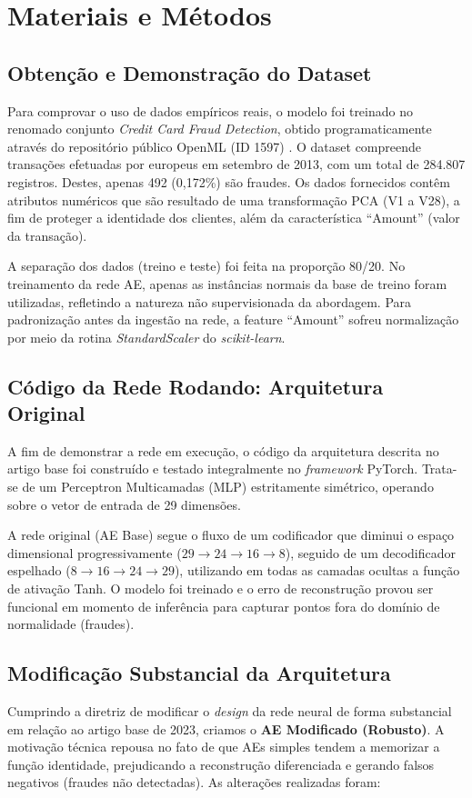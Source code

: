 \documentclass[runningheads]{template_llncs/llncs}
\begin{document}
\section{Materiais e Métodos}

\subsection{Obtenção e Demonstração do Dataset}
Para comprovar o uso de dados empíricos reais, o modelo foi treinado no renomado conjunto \emph{Credit Card Fraud Detection}, obtido programaticamente através do repositório público OpenML (ID 1597) \cite{kaggle}. 
O dataset compreende transações efetuadas por europeus em setembro de 2013, com um total de 284.807 registros. Destes, apenas 492 (0,172\%) são fraudes. 
Os dados fornecidos contêm atributos numéricos que são resultado de uma transformação PCA (V1 a V28), a fim de proteger a identidade dos clientes, além da característica ``Amount'' (valor da transação).

A separação dos dados (treino e teste) foi feita na proporção 80/20. No treinamento da rede AE, apenas as instâncias normais da base de treino foram utilizadas, refletindo a natureza não supervisionada da abordagem. Para padronização antes da ingestão na rede, a feature ``Amount'' sofreu normalização por meio da rotina \emph{StandardScaler} do \emph{scikit-learn}.

\subsection{Código da Rede Rodando: Arquitetura Original}
A fim de demonstrar a rede em execução, o código da arquitetura descrita no artigo base foi construído e testado integralmente no \emph{framework} PyTorch. Trata-se de um Perceptron Multicamadas (MLP) estritamente simétrico, operando sobre o vetor de entrada de 29 dimensões.

A rede original (AE Base) segue o fluxo de um codificador que diminui o espaço dimensional progressivamente ($29 \to 24 \to 16 \to 8$), seguido de um decodificador espelhado ($8 \to 16 \to 24 \to 29$), utilizando em todas as camadas ocultas a função de ativação Tanh. O modelo foi treinado e o erro de reconstrução provou ser funcional em momento de inferência para capturar pontos fora do domínio de normalidade (fraudes).

\subsection{Modificação Substancial da Arquitetura}
Cumprindo a diretriz de modificar o \emph{design} da rede neural de forma substancial em relação ao artigo base de 2023, criamos o \textbf{AE Modificado (Robusto)}. A motivação técnica repousa no fato de que AEs simples tendem a memorizar a função identidade, prejudicando a reconstrução diferenciada e gerando falsos negativos (fraudes não detectadas). As alterações realizadas foram:
\end{document}
